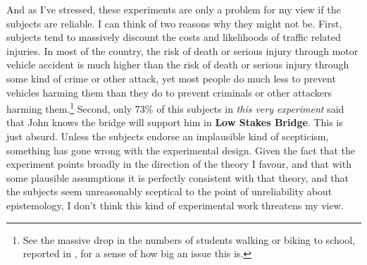 And as I've stressed, these experiments are only a problem for my view if the subjects are reliable. I can think of two reasons why they might not be. First, subjects tend to massively discount the costs and likelihoods of traffic related injuries. In most of the country, the risk of death or serious injury through motor vehicle accident is much higher than the risk of death or serious injury through some kind of crime or other attack, yet most people do much less to prevent vehicles harming them than they do to prevent criminals or other attackers harming them.\footnote{See the massive drop in the numbers of students walking or biking to school, reported in \cite{Ham2008}, for a sense of how big an issue this is.} Second, only 73\% of this subjects in \textit{this very experiment} said that John knows the bridge will support him in \textbf{Low Stakes Bridge}. This is just absurd. Unless the subjects endorse an implausible kind of scepticism, something has gone wrong with the experimental design. Given the fact that the experiment points broadly in the direction of the theory I favour, and that with some plausible assumptions it is perfectly consistent with that theory, and that the  subjects seem unreasonably sceptical to the point of unreliability about epistemology, I don't think this kind of experimental work threatens my view.